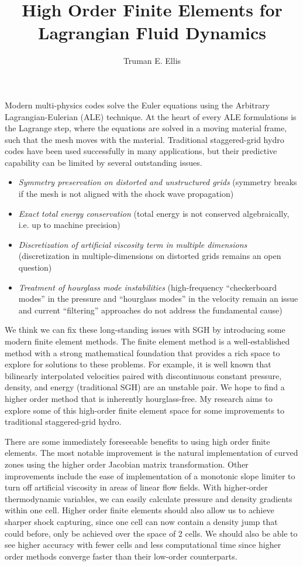 \documentclass[a4paper,10pt]{article}
\title{High Order Finite Elements for Lagrangian Fluid Dynamics}
\author{Truman E. Ellis}
\begin{document}
\maketitle

Modern multi-physics codes solve the Euler equations using the Arbitrary Lagrangian-Eulerian (ALE) technique. At the heart of every ALE formulations is the Lagrange step, where the equations are solved in a moving material frame, such that the mesh moves with the material. Traditional staggered-grid hydro codes have been used successfully in many applications, but their predictive capability can be limited by several outstanding issues.
\begin{itemize}
 \item \textit{Symmetry preservation on distorted and unstructured grids} 
 (symmetry breaks if the mesh is not aligned with the shock wave propagation)
 \item \textit{Exact total energy conservation}
 (total energy is not conserved algebraically, i.e. up to machine precision)
 \item \textit{Discretization of artificial viscosity term in multiple dimensions}
 (discretization in multiple-dimensions on distorted grids remains an open
question)
 \item \textit{Treatment of hourglass mode instabilities}
 (high-frequency “checkerboard modes” in the pressure and “hourglass modes” in the velocity
remain an issue and current “filtering” approaches do not address the fundamental cause)
\end{itemize}

We think we can fix these long-standing issues with SGH by introducing some modern finite element methods. The finite element method is a well-established method with a strong mathematical foundation that provides a rich space to explore for solutions to these problems. For example, it is well known that bilinearly interpolated velocities paired with discontinuous constant pressure, density, and energy (traditional SGH) are an unstable pair. We hope to find a higher order method that is inherently hourglass-free. My research aims to explore some of this high-order finite element space for some improvements to traditional staggered-grid hydro.

There are some immediately foreseeable benefits to using high order finite elements. The most notable improvement is the natural implementation of curved zones using the higher order Jacobian matrix transformation. Other improvements include the ease of implementation of a monotonic slope limiter to turn off artificial viscosity in areas of linear flow fields. With higher-order thermodynamic variables, we can easily calculate pressure and density gradients within one cell. Higher order finite elements should also allow us to achieve sharper shock capturing, since one cell can now contain a density jump that could before, only be achieved over the space of 2 cells. We should also be able to see higher accuracy with fewer cells and less computational time since higher order methods converge faster than their low-order counterparts.
\end{document}
